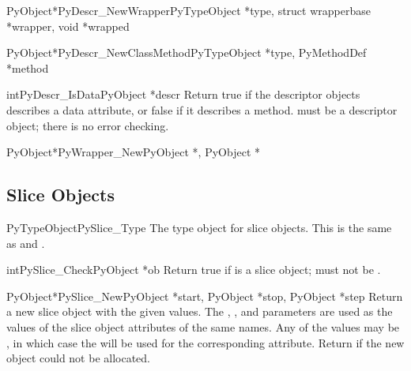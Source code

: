 \begin{cfuncdesc}{PyObject*}{PyDescr_NewWrapper}{PyTypeObject *type,
						 struct wrapperbase *wrapper,
                                                 void *wrapped}
\end{cfuncdesc}

\begin{cfuncdesc}{PyObject*}{PyDescr_NewClassMethod}{PyTypeObject *type,
						     PyMethodDef *method}
\end{cfuncdesc}

\begin{cfuncdesc}{int}{PyDescr_IsData}{PyObject *descr}
  Return true if the descriptor objects  describes a data
  attribute, or false if it describes a method.   must be a
  descriptor object; there is no error checking.
\end{cfuncdesc}

\begin{cfuncdesc}{PyObject*}{PyWrapper_New}{PyObject *, PyObject *}
\end{cfuncdesc}


\subsection{Slice Objects \label{slice-objects}}

\begin{cvardesc}{PyTypeObject}{PySlice_Type}
  The type object for slice objects.  This is the same as
   and .
\end{cvardesc}

\begin{cfuncdesc}{int}{PySlice_Check}{PyObject *ob}
  Return true if  is a slice object;  must not be
  \NULL{}.
\end{cfuncdesc}

\begin{cfuncdesc}{PyObject*}{PySlice_New}{PyObject *start, PyObject *stop,
                                          PyObject *step}
  Return a new slice object with the given values.  The ,
  , and  parameters are used as the values of the
  slice object attributes of the same names.  Any of the values may be
  \NULL{}, in which case the  will be used for the
  corresponding attribute.  Return \NULL{} if the new object could
  not be allocated.
\end{cfuncdesc}

